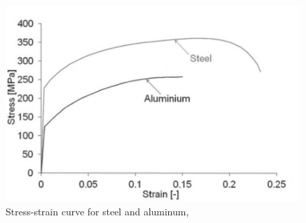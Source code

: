 \begin{figure}[!htbp]
\centering
\includegraphics[width= \linewidth]{../figures/stress_strain_steel_al.jpg}
  \caption{Stress-strain curve for steel and aluminum, \cite{liu2013failure}}
  \label{fig:stress_strain_steel_al}
\end{figure}
\FloatBarrier
